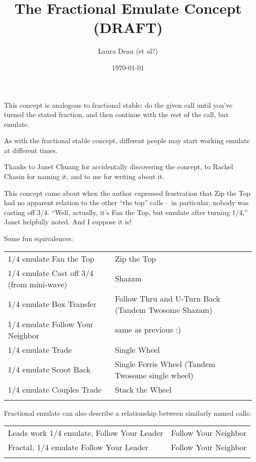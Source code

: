 \documentclass[11pt]{article}
\title{The Fractional Emulate Concept (DRAFT)}
\author{Laura Dean (et al?)}
\date{\today}
\begin{document}
\thispagestyle{empty}
\maketitle


This concept is analogous to fractional stable:
do the given call until you've turned the stated fraction,
and then continue with the rest of the call, but emulate.

As with the fractional stable concept, different people may start
working emulate at different times.

Thanks to Janet Chuang for accidentally discovering the concept,
to Rachel Chasin for naming it, and to me for writing about it.

This concept came about when the author expressed frustration that Zip
the Top had no apparent relation to the other ``the top'' calls -- in
particular, nobody was casting off 3/4. 
``Well, actually, it's Fan the Top, but emulate after turning 1/4,''
Janet helpfully noted.  And I suppose it is!

Some fun equivalences:

\begin{tabular}{ll}
\hline
1/4 emulate Fan the Top   & Zip the Top \\
1/4 emulate Cast off 3/4 (from mini-wave)  & Shazam \\
1/4 emulate Box Transfer & Follow Thru and U-Turn Back (Tandem Twosome Shazam) \\
1/4 emulate Follow Your Neighbor  & same as previous :) \\
1/4 emulate Trade                          & Single Wheel \\
1/4 emulate Scoot Back  & Single Ferris Wheel (Tandem Twosome single wheel)\\
1/4 emulate Couples Trade  & Stack the Wheel \\
\hline \\
\end{tabular}

Fractional emulate can also describe a relationship between similarly named calls:

\begin{tabular}{ll}
\hline
Leads work 1/4 emulate, Follow Your Leader & Follow Your Neighbor \\
Fractal, 1/4 emulate Follow Your Leader    & Follow Your Neighbor \\
\hline \\
\end{tabular}
\end{document}
